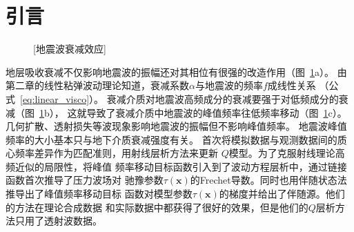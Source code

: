\section{引言}
\begin{figure}[!htbp]
    \centering
    [地震波衰减效应]
    \label{fig:q_effect}
\end{figure}
地层吸收衰减不仅影响地震波的振幅还对其相位有很强的改造作用（图~\ref{fig:q_effect}a）。
由第二章的线性粘弹波动理论知道，衰减系数$\alpha$与地震波的频率$f$成线性关系
（公式~\ref{eq:linear_visco}）。
衰减介质对地震波高频成分的衰减要强于对低频成分的衰减（图~\ref{fig:q_effect}b），
这就导致了衰减介质中地震波的峰值频率往低频率移动（图~\ref{fig:q_effect}c）。
几何扩散、透射损失等波现象影响地震波的振幅但不影响峰值频率。
地震波峰值频率的大小基本只与地下介质衰减强度有关。
首次将模拟数据与观测数据间的质心频率差异作为匹配准则，用射线层析方法来更新
$Q$模型。为了克服射线理论高频近似的局限性，将峰值
频率移动目标函数引入到了波动方程层析中，通过链接函数首次推导了压力波场对
驰豫参数$\tau(\mathbf{x})$的Frechet导数。同时也用伴随状态法推导出了峰值频率移动目标
函数对模型参数$\tau(\mathbf{x})$的梯度并给出了伴随源。他们的方法在理论合成数据
和实际数据中都获得了很好的效果，但是他们的$Q$层析方法只用了透射波数据。

